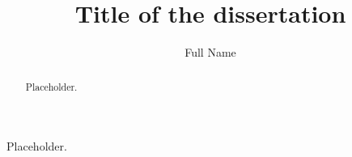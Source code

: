 \documentclass[
  bibfile = references.bib,
]{uhmdiss}
\title{Title of the dissertation}
\author{Full Name}
\begin{document}
\maketitle
\copyrightpage                      %
\dedication{Dedication (optional).} %

\begin{acknowledgments}
Placeholder.
\end{acknowledgments}

\begin{abstract}
Placeholder.
\end{abstract}

\tableofcontents
\listoftables
\listoffigures
\listofabbreviations                %

\mainmatter



\appendix


\printbibliography
\end{document}
